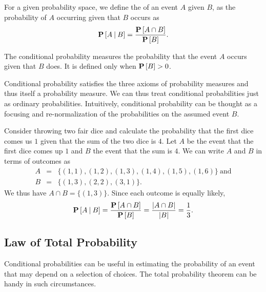\begin{definition}
For a given probability space, we define the  of an event $A$ given $B$, as the probability of $A$
occurring given that $B$ occurs as
\[
\mathbf{P}\left[{A {\:\mid\:} B}\right] = \frac{\mathbf{P}\left[{A \cap B}\right]}{\mathbf{P}\left[{B}\right]}. 
\]

The conditional probability measures the probability that the event
$A$ occurs given that $B$ does.  It is defined only when $\mathbf{P}\left[{B}\right] > 0$.
\end{definition}


\begin{flex}

\begin{gram}
Conditional probability satisfies the three axioms of probability measures and thus itself a probability measure.
We can thus treat conditional probabilities just as ordinary
probabilities.  Intuitively, conditional probability can be thought as
a focusing and re-normalization of the probabilities on the
assumed event $B$.
%
\end{gram}

\begin{example}
Consider throwing two fair dice and calculate the probability that the
first dice comes us $1$ given that the sum of the two dice is $4$. 
%
Let $A$ be the event  that the first dice comes up $1$ and $B$ the
event that the sum is $4$.
%
We can write $A$ and $B$ in terms of outcomes as 
\[
\begin{array}{lll}
A & = & \{ (1,1), (1,2), (1,3), (1,4), (1,5), (1,6) \}~\mbox{and}
\\
B & = & \{ (1,3), (2,2), (3,1) \}.
\end{array}
\]
We thus have $A \cap B = \{ (1,3) \}$.
%
Since each outcome is equally likely, 
\[
\prob{A \given B} = \frac{\prob{A \cap B}}{\prob{B}} 
%
= 
%
\frac{|A \cap B|}{|B|} = \frac{1}{3}.
\]
\end{example}
\end{flex}

\subsection{Law of Total Probability}
\label{sec:probability::theory::LTP}
\begin{gram}
  
Conditional probabilities can be useful in estimating the probability
of an event that may depend on a selection of choices.
%
The total probability theorem can be handy in such circumstances.
\end{gram}

